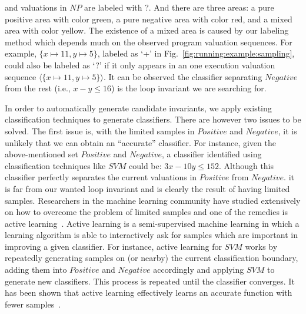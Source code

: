 and valuations in $\mathit{NP}$ are labeled with ?. %
And there are three areas: a pure positive area with color green, a pure negative area with color red, and a mixed area with color yellow.
The existence of a mixed area is caused by our labeling method which depends much on the observed program valuation sequences.
For example, $\mathit{\{x \mapsto 11, y \mapsto 5\}}$, labeled as `+' in Fig.~\ref{fig:running:example:sampling}, 
could also be labeled as `?' if it only appears in an one execution valuation sequence $\mathit{\langle \{x \mapsto 11, y \mapsto 5\} \rangle}$.
It can be observed the classifier separating $\mathit{Negative}$ from the rest (i.e., $\mathit{x - y \leq 16}$) 
is the loop invariant we are searching for. 

In order to automatically generate candidate invariants, we apply existing classification techniques to generate classifiers. 
There are however two issues to be solved. The first issue is, with the limited samples in $\mathit{Positive}$ and $\mathit{Negative}$, 
it is unlikely that we can obtain an ``accurate'' classifier. 
For instance, given the above-mentioned set $\mathit{Positive}$ and $\mathit{Negative}$, 
a classifier identified using classification techniques like $\mathit{SVM}$ could be: $\mathit{3x-10y \leq 152}$. %
Although this classifier perfectly separates the current valuations in $\mathit{Positive}$ from $\mathit{Negative}$. 
it is far from our wanted loop invariant and is clearly the result of having limited samples. 
Researchers in the machine learning community have studied extensively on how to overcome the problem of limited samples and one of the remedies is active learning~\cite{DBLP:series/synthesis/2012Settles}. 
Active learning is a semi-supervised machine learning in which a learning algorithm is able to interactively ask for samples which are important in improving a given classifier. 
For instance, active learning for $\mathit{SVM}$ works by repeatedly generating samples on (or nearby) the current classification boundary, adding them into $\mathit{Positive}$ and $\mathit{Negative}$ accordingly and applying $\mathit{SVM}$ to generate new classifiers. 
This process is repeated until the classifier converges. It has been shown that active learning effectively learns an accurate function with fewer samples~\cite{DBLP:conf/icml/SchohnC00}.


